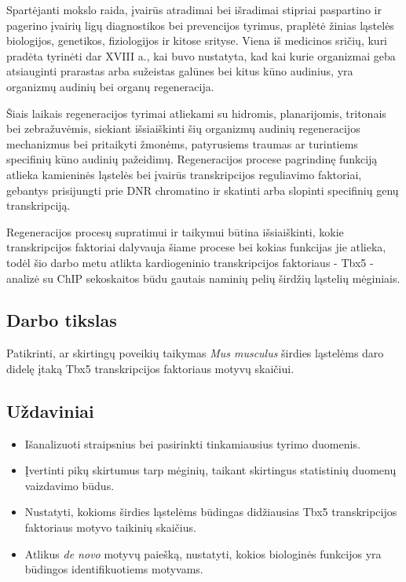 \documentclass[12pt]{article}
\begin{document}
Spartėjanti mokslo raida, įvairūs atradimai bei išradimai stipriai paspartino
ir pagerino įvairių ligų diagnostikos bei prevencijos tyrimus, praplėtė žinias
ląstelės biologijos, genetikos, fiziologijos ir kitose srityse. Viena iš
medicinos sričių, kuri pradėta tyrinėti dar XVIII a., kai buvo nustatyta, kad
kai kurie organizmai geba atsiauginti prarastas arba sužeistas galūnes bei
kitus kūno audinius\cite{REGENERATION}, yra organizmų audinių bei organų
regeneracija.

Šiais laikais regeneracijos tyrimai atliekami su hidromis, planarijomis,
tritonais bei zebražuvėmis\cite{ORGANISMS}, siekiant išsiaiškinti šių organizmų
audinių regeneracijos mechanizmus bei pritaikyti žmonėms, patyrusiems traumas
ar turintiems specifinių kūno audinių pažeidimų. Regeneracijos procese
pagrindinę funkciją atlieka kamieninės ląstelės bei įvairūs transkripcijos
reguliavimo faktoriai, gebantys prisijungti prie DNR chromatino ir skatinti
arba slopinti specifinių genų transkripciją.

Regeneracijos procesų supratimui ir taikymui būtina išsiaiškinti, kokie
transkripcijos faktoriai dalyvauja šiame procese bei kokias funkcijas jie
atlieka, todėl šio darbo metu atlikta kardiogeninio transkripcijos
faktoriaus - Tbx5 - analizė su ChIP sekoskaitos būdu gautais naminių pelių
širdžių ląstelių mėginiais.

\subsection*{Darbo tikslas}

Patikrinti, ar skirtingų poveikių taikymas \emph{Mus musculus} širdies
ląstelėms daro didelę įtaką Tbx5 transkripcijos faktoriaus motyvų skaičiui.

\subsection*{Uždaviniai}
\begin{itemize}
    \item Išanalizuoti straipsnius bei pasirinkti tinkamiausius tyrimo duomenis.
    \item Įvertinti pikų skirtumus tarp mėginių, taikant skirtingus statistinių
        duomenų vaizdavimo būdus.
    \item Nustatyti, kokioms širdies ląstelėms būdingas didžiausias Tbx5
        transkripcijos faktoriaus motyvo taikinių skaičius.
    \item Atlikus \emph{de novo} motyvų paiešką, nustatyti, kokios biologinės
        funkcijos yra būdingos identifikuotiems motyvams.
\end{itemize}
\end{document}
